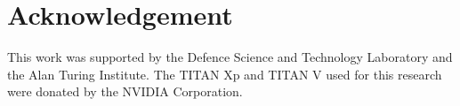 \documentclass[a4paper,11pt]{article}
\begin{document}
\section*{Acknowledgement}
This work was supported by the Defence Science and Technology Laboratory and the Alan Turing Institute. The TITAN Xp and TITAN V used for this research were donated by the NVIDIA Corporation.

\appendix





\end{document}
